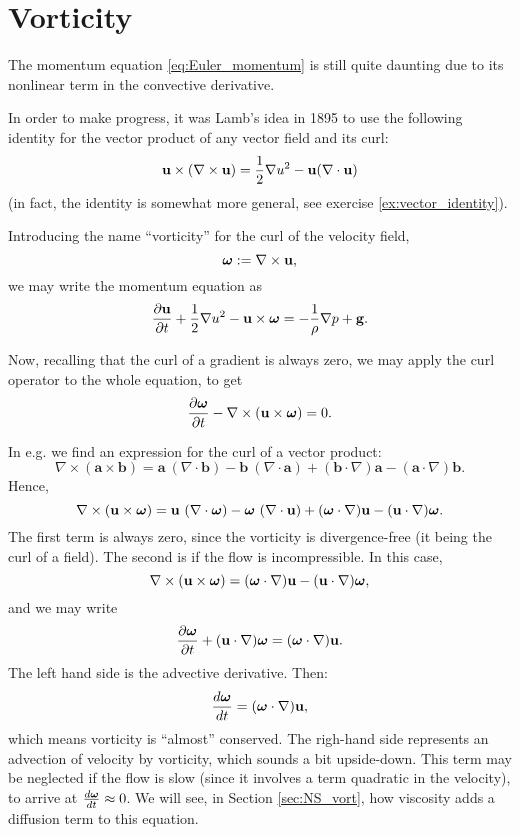 \section{Vorticity}
\label{sec:Euler_vort}

The momentum equation \ref{eq:Euler_momentum} is still quite daunting
due to its nonlinear term in the convective derivative.

In order to make progress, it was Lamb's idea in 1895 to use the
following identity for the vector product of any vector field and its
curl:
\begin{equation}
  \label{eq:Lambs_identity}
  \mathbf{u} \times ( \nabla\times \mathbf{u}) =
  \frac12 \nabla u^2 - \mathbf{u} (\nabla\cdot\mathbf{u} )
\end{equation}
(in fact, the identity is somewhat more general, see exercise
\ref{ex:vector_identity}).

Introducing the name ``vorticity'' for the curl of the velocity field,
\[
\bm{\omega} := \nabla\times\mathbf{u} ,
\]
we may write the momentum equation as
\begin{equation}
  \label{eq:Euler_momentum_w_vort}
  \frac{\partial \mathbf{u} }{\partial t} +
  \frac12 \nabla u^2 - \mathbf{u} \times\bm{\omega} =
  - \frac{1}{\rho} \nabla p 
  + \mathbf{g} .
\end{equation}

Now, recalling that the curl of a gradient is always zero,
we may apply the curl operator to the whole equation, to get
\[
\frac{\partial \bm{\omega} }{\partial t} -
\nabla\times(\mathbf{u}\times\bm{\omega}) = 0 .
\]

In e.g. \cite{wiki:Vector_calculus_identities} we find an expression
for the curl of a vector product:
\[
  \nabla \times (\mathbf {a} \times \mathbf {b} ) =
  \mathbf {a} \ (\nabla \cdot \mathbf {b} )
  -\mathbf {b} \ (\nabla \cdot \mathbf {a} )
  +(\mathbf {b} \cdot \nabla )\mathbf {a}
  -(\mathbf {a} \cdot \nabla )\mathbf {b} .
\]
Hence,
\[
  \nabla \times (\mathbf{u} \times \bm{\omega} ) =
  \mathbf{u} \ (\nabla \cdot \bm{\omega} )
  -\bm{\omega} \ (\nabla \cdot \mathbf{u} )
  +(\bm{\omega} \cdot \nabla )\mathbf{u}
  -(\mathbf{u} \cdot \nabla )\bm{\omega}.
\]
The first term is always zero, since the vorticity is divergence-free
(it being the curl of a field). The second is if the flow is
incompressible. In this case,
\begin{equation}
  \label{eq:conv_accel_as_vort}
  \nabla \times (\mathbf{u} \times \bm{\omega} ) =
  (\bm{\omega} \cdot \nabla )\mathbf{u}
  -(\mathbf{u} \cdot \nabla )\bm{\omega},
\end{equation}
and we may write
\[
  \frac{\partial \bm{\omega} }{\partial t}
  + ( \mathbf{u} \cdot \nabla )\bm{\omega} =  (\bm{\omega} \cdot \nabla )\mathbf{u} .
\]
The left hand side is the advective derivative. Then:
\[
  \frac{d \bm{\omega} }{d t}  =  (\bm{\omega} \cdot \nabla )\mathbf{u} ,
\]
which means vorticity is ``almost'' conserved. The righ-hand side
represents an advection of velocity by vorticity, which sounds a bit
upside-down. This term may be neglected if the flow is slow (since it
involves a term quadratic in the velocity), to arrive at
$\frac{d \bm{\omega} }{d t}\approx 0$. We will see, in Section
\ref{sec:NS_vort}, how viscosity adds a diffusion term to this
equation.


